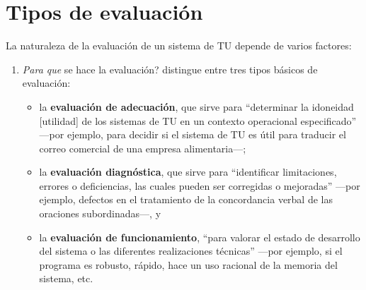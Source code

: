 \section{Tipos de evaluación} \label{ss:tipusaval} La naturaleza de la evaluación de un sistema de TU depende de varios factores: \begin{enumerate} \item \emph{Para que} se hace la evaluación? \citet{hutchins96u} distingue entre tres tipos básicos de evaluación: \begin{itemize} \item la \textbf{evaluación de adecuación}, que sirve para ``determinar la idoneidad [utilidad] de los sistemas de TU en un contexto operacional especificado'' ---por ejemplo, para decidir si el sistema de TU es útil para traducir el correo comercial de una empresa alimentaria---; \item la \textbf{evaluación diagnóstica}, que sirve para ``identificar limitaciones, errores o deficiencias, las cuales pueden ser corregidas o mejoradas'' ---por ejemplo, defectos en el tratamiento de la concordancia verbal de las oraciones subordinadas---, y \item la  \textbf{evaluación de funcionamiento}, ``para valorar el estado de desarrollo del sistema o las diferentes realizaciones técnicas'' ---por ejemplo, si el programa es robusto, rápido, hace un uso racional de la memoria del sistema, etc. \end{itemize} 


\end{enumerate}

